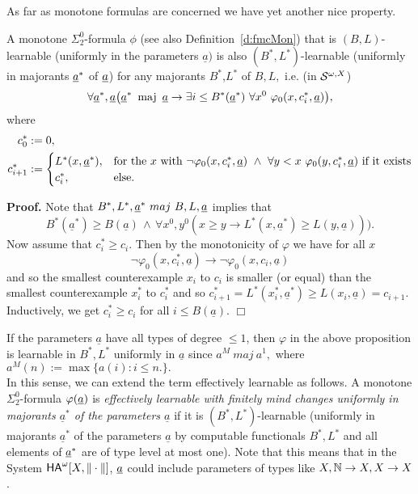 As far as monotone formulas are concerned we have yet another nice property.
\begin{prop}\label{p:majBL}
A monotone $\Sigma^0_2$-formula $\phi$ (see also Definition~\ref{d:fmcMon}) that is $(B,L)$-learnable (uniformly in the parameters $\underline{a})$ 
is also $(B^*,L^*)$-learnable (uniformly in majorants $\underline a^*$ of 
$\underline a$) for any majorants $B^*$,$L^*$ of $B,L,$ i.e. 
(in ${\cal S}^{\omega,X}$)  
\[ \forall 
\underline{a}^*,\underline{a} \big( 
\underline{a}^* \ \operatorname{maj}\ \underline{a}\to 
\exists i\leq B^*(\underline a^*)\ \forall x^0\ \varphi_0(x,c^*_i,\underline a)\big),\] where
\begin{align*}
c^*_0&:=0,\\
c^*_{i+1}&:=
\begin{cases}
L^*(x, \underline a^*),&\text{for the $x$ with } \neg\varphi_0(x,c^*_i,\underline a)\ \wedge\ \forall y<x\ \varphi_0(y,c^*_i,\underline a) \text{ if it exists}\\
c^*_i,&\text{else}.
\end{cases}
\end{align*}
\end{prop}
{\bf Proof.} Note that $B^*,L^*,\underline a^* \ maj \ B,L,\underline a$ implies that 
\[ B^*(\underline{a}^*) \ge B(\underline{a}) \,\wedge\,\forall x^0,y^0 
(x\ge y\to L^*(x,\underline{a}^*)\ge L(y,\underline{a}))).\] 
Now assume that $c^*_i\ge c_i.$ Then by the monotonicity of $\varphi$ 
we have for all $x$ 
\[ \neg \varphi_0(x,c^*_i,\underline{a})\rightarrow \neg \varphi_0
(x,c_i,\underline{a}) \] 
and so the smallest counterexample $x_i$ to $c_i$ is smaller (or equal) 
than the smallest counterexample $x^*_i$ to $c^*_i$ and so 
$c^*_{i+1}=L^*(x^*_i,\underline{a}^*) \ge L(x_i,\underline{a})=c_{i+1}.$ 
Inductively, we get $c^*_i\ge c_i$ for all $i\le B(\underline{a}).$ 
\hfill $\Box$  


\begin{rmk} If the parameters $\underline{a}$ have all types of degree 
$\le 1$, then $\varphi$ in the above proposition is learnable in $B^*,L^*$ 
uniformly in $\underline{a}$ since $a^M \ maj \ a^1,$ where 
$a^M(n):=\max\{ a(i):i\le n.\}.$
\\ In this sense, we can extend the term effectively learnable as follows. A monotone $\Sigma^0_2$-formula $\varphi(\underline a)$ is 
{\em effectively learnable with finitely mind changes uniformly in 
majorants $\underline{a}^*$ of the parameters $\underline{a}$} if it is 
$(B^*,L^*)$-learnable (uniformly in majorants $\underline{a}^*$ of the 
parameters $\underline{a}$ by computable functionals $B^*,L^*$ and all elements of $\underline a^*$ are of type level at most one). 
Note that this means that in the System ${\textsf{\upshape HA}}^\omega[X,\|\cdot\|]$, $\underline a$ could include parameters of types like $X,\mathbb{N}\to X,X\to X$.
\end{rmk}



